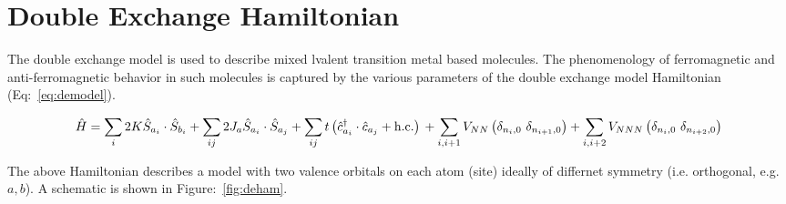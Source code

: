 \documentclass[12pt,twoside]{report}
\begin{document}
	\chapter{Double Exchange Hamiltonian}
	
	The double exchange model is used to describe mixed lvalent transition
	metal based molecules. The phenomenology of ferromagnetic and anti-ferromagnetic
	behavior in such molecules is captured by the various parameters of the
	double exchange model Hamiltonian (Eq:~\ref{eq:demodel}).
	
	\begin{equation}
			\hat{H} = \sum_i 2K \hat{S}_{a_i}\cdot\hat{S}_{b_i} 
			+ \sum_{ij} 2J_a \hat{S}_{a_i}\cdot\hat{S}_{a_j} 
			+ \sum_{ij} t\left( \hat{c}^{\dagger}_{a_i}\cdot\hat{c}_{a_j} + \text{h.c.}\right ) \\
			+ \sum_{i,i+1} V_{NN}\left ( \delta_{n_i,0}\ \delta_{n_{i+1},0} \right ) 
			+ \sum_{i,i+2} V_{NNN}\left ( \delta_{n_i,0}\ \delta_{n_{i+2},0} \right )
		\label{eq:demodel}
	\end{equation}
	
	The above Hamiltonian describes a model with two valence orbitals on each
	atom (site) ideally of differnet symmetry (i.e. orthogonal, e.g. $a,b$). A schematic is shown in
	Figure:~\ref{fig:deham}.
	
			
			
	
\end{document}
